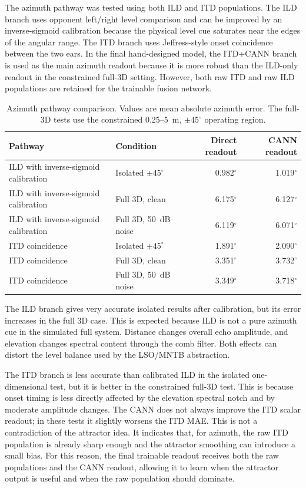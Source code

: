 The azimuth pathway was tested using both ILD and ITD populations. The ILD branch uses opponent left/right level comparison and can be improved by an inverse-sigmoid calibration because the physical level cue saturates near the edges of the angular range. The ITD branch uses Jeffress-style onset coincidence between the two ears. In the final hand-designed model, the ITD+CANN branch is used as the main azimuth readout because it is more robust than the ILD-only readout in the constrained full-3D setting. However, both raw ITD and raw ILD populations are retained for the trainable fusion network.

\begin{table}[H]
    \centering
    \caption{Azimuth pathway comparison. Values are mean absolute azimuth error. The full-3D tests use the constrained 0.25--5~m, $\pm45^\circ$ operating region.}
    \label{tab:azimuth_pathway_results}
    \small
    \begin{tabular}{llrr}
        \toprule
        Pathway & Condition & Direct readout & CANN readout \\
        \midrule
        ILD with inverse-sigmoid calibration & Isolated $\pm45^\circ$ & 0.982$^\circ$ & 1.019$^\circ$ \\
        ILD with inverse-sigmoid calibration & Full 3D, clean & 6.175$^\circ$ & 6.127$^\circ$ \\
        ILD with inverse-sigmoid calibration & Full 3D, 50~dB noise & 6.119$^\circ$ & 6.071$^\circ$ \\
        \midrule
        ITD coincidence & Isolated $\pm45^\circ$ & 1.891$^\circ$ & 2.090$^\circ$ \\
        ITD coincidence & Full 3D, clean & 3.351$^\circ$ & 3.732$^\circ$ \\
        ITD coincidence & Full 3D, 50~dB noise & 3.349$^\circ$ & 3.718$^\circ$ \\
        \bottomrule
    \end{tabular}
\end{table}

The ILD branch gives very accurate isolated results after calibration, but its error increases in the full 3D case. This is expected because ILD is not a pure azimuth cue in the simulated full system. Distance changes overall echo amplitude, and elevation changes spectral content through the comb filter. Both effects can distort the level balance used by the LSO/MNTB abstraction.

The ITD branch is less accurate than calibrated ILD in the isolated one-dimensional test, but it is better in the constrained full-3D test. This is because onset timing is less directly affected by the elevation spectral notch and by moderate amplitude changes. The CANN does not always improve the ITD scalar readout; in these tests it slightly worsens the ITD MAE. This is not a contradiction of the attractor idea. It indicates that, for azimuth, the raw ITD population is already sharp enough and the attractor smoothing can introduce a small bias. For this reason, the final trainable readout receives both the raw populations and the CANN readout, allowing it to learn when the attractor output is useful and when the raw population should dominate.

